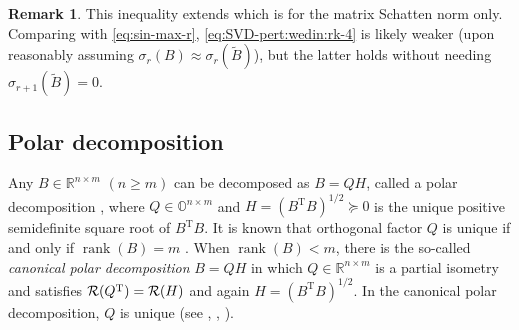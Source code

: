 \documentclass[11pt]{article}
\def\bbO{\mathbb{O}}
\def\bbR{\mathbb{R}}
\def\cR{{\cal R}}
\def\cU{{\cal U}}
\def\cV{{\cal V}}
\def\sss{\scriptscriptstyle}
\DeclareMathOperator{\Sq}{Sq}
\DeclareMathOperator{\rank}{rank}
\DeclareMathOperator{\T}{T}
\def\wtd{\widetilde}
\def\bestr{\mbox{\scriptsize\rm best-$r$}}
\theoremstyle{definition}
\newtheorem{remark}{Remark}[section]
\numberwithin{equation}{section}
\numberwithin{figure}{section}
\numberwithin{table}{section}
\begin{document}
\begin{remark}
This inequality extends \cite[Theorem~5]{luhz:2021} which is for the matrix Schatten norm only.
Comparing with \eqref{eq:sin-max-r}, \eqref{eq:SVD-pert:wedin:rk-4} is likely weaker (upon reasonably assuming
$\sigma_r(B)\approx\sigma_r(\wtd B)$), but the latter holds without needing $\sigma_{r+1}(\wtd B)=0$.
\end{remark}
\fi


\subsection{Polar decomposition}
Any $B\in\bbR^{n\times m}$ $(n\ge m)$ can be decomposed as $B=QH$, called a polar decomposition \cite[p.449]{hojo:2013},
where $Q\in\bbO^{n\times m}$ and $H=(B^{\T}B)^{1/2}\succeq 0$ is the unique positive semidefinite square root of $B^{\T}B$.
It is known that orthogonal factor $Q$  is unique if and only if $\rank(B)=m$ \cite{li:2014HLA}. When $\rank(B)<m$,
there is  the so-called {\em canonical polar decomposition\/} $B=QH$ in which $Q\in\bbR^{n\times m}$
is a partial isometry and satisfies $\cR(Q^{\T})=\cR(H)$ and again $H=(B^{\T}B)^{1/2}$.
In the canonical polar decomposition, $Q$ is unique
(see \cite[p.220]{begr:2003}, \cite[chapter~8]{high:2008}, \cite{li:1993b}).

\end{document}
